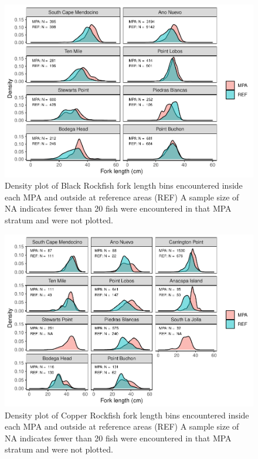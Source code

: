 \documentclass[
]{article}
\begin{document}
\begin{figure}
\centering
\includegraphics{CCRFP_available_data_for_assessments_files/figure-latex/lengths-1.pdf}
\caption{\label{fig:lengths-1}Density plot of Black Rockfish fork length bins encountered inside each MPA and outside at reference areas (REF) A sample size of NA indicates fewer than 20 fish were encountered in that MPA stratum and were not plotted.}
\end{figure}

\begin{figure}
\centering
\includegraphics{CCRFP_available_data_for_assessments_files/figure-latex/lengths-2.pdf}
\caption{\label{fig:lengths-2}Density plot of Copper Rockfish fork length bins encountered inside each MPA and outside at reference areas (REF) A sample size of NA indicates fewer than 20 fish were encountered in that MPA stratum and were not plotted.}
\end{figure}
\end{document}
